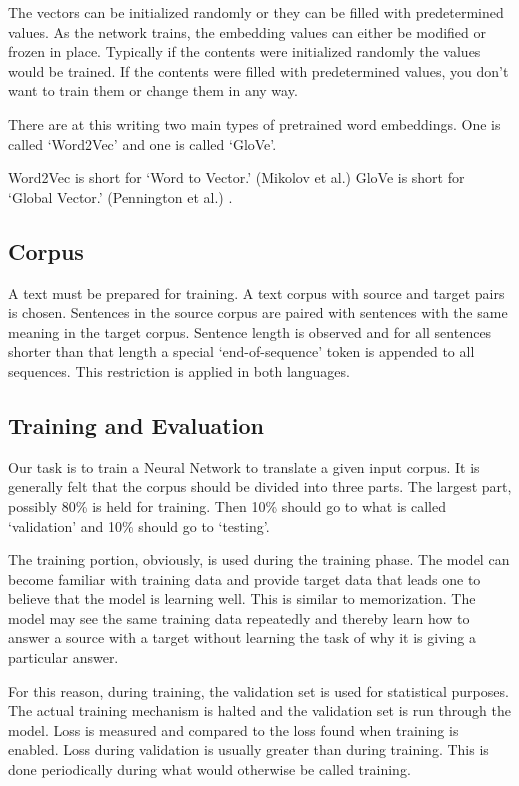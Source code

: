 The vectors can be initialized randomly or they can be filled with predetermined values. As the network trains, the embedding values can either be modified or frozen in place. Typically if the contents were initialized randomly the values would be trained. If the contents were filled with predetermined values, you don\textquoteright t want to train them or change them in any way. 

There are at this writing two main types of pretrained word embeddings. One is called \textquoteleft Word2Vec\textquoteright{} and one is called \textquoteleft GloVe\textquoteright . 

Word2Vec is short for \textquoteleft Word to Vector.\textquoteright{} (Mikolov et al.) \cite{mikolov2013efficient} GloVe is short for \textquoteleft Global Vector.\textquoteright{} (Pennington et al.) \cite{pennington-etal-2014-glove} .


\subsection{Corpus}

A text must be prepared for training. A text corpus with source and target pairs is chosen. Sentences in the source corpus are paired with sentences with the same meaning in the target corpus. Sentence length is observed and for all sentences shorter than that length a special `end-of-sequence' token is appended to all sequences. This restriction is applied in both languages.

\subsection{Training and Evaluation}
Our task is to train a Neural Network to translate a given input corpus. It is generally felt that the corpus should be divided into three parts. The largest part, possibly 80\% is held for training. Then 10\% should go to what is called `validation' and 10\% should go to `testing'.

The training portion, obviously, is used during the training phase. The model can become familiar with training data and provide target data that leads one to believe that the model is learning well. This is similar to memorization. The model may see the same training data repeatedly and thereby learn how to answer a source with a target without learning the task of why it is giving a particular answer.

For this reason, during training, the validation set is used for statistical purposes. The actual training mechanism is halted and the validation set is run through the model. Loss is measured and compared to the loss found when training is enabled. Loss during validation is usually greater than during training. This is done periodically during what would otherwise be called training.

